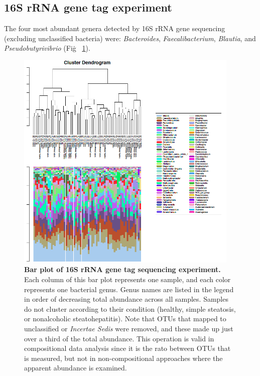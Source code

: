 \subsection{16S rRNA gene tag experiment}

The four most abundant genera detected by 16S rRNA gene sequencing (excluding unclassified bacteria) were: \textit{Bacteroides}, \textit{Faecalibacterium}, \textit{Blautia}, and \textit{Pseudobutyrivibrio} (Fig\. ~\ref{nafld_16s_barplot}).

\begin{figure}[h]
\begin{center}
\includegraphics[width=0.95\textwidth]{16s_genus_barplot.png}
\caption[Bar plot of 16S rRNA gene tag sequencing experiment.]{\textbf{Bar plot of 16S rRNA gene tag sequencing experiment.} Each column of this bar plot represents one sample, and each color represents one bacterial genus. Genus names are listed in the legend in order of decreasing total abundance across all samples. Samples do not cluster according to their condition (healthy, simple steatosis, or nonalcoholic steatohepatitis). Note that OTUs that mapped to unclassified or \textit{Incertae Sedis} were removed, and these made up just over a third of the total abundance. This operation is valid in compositional data analysis since it is the rato between OTUs that is measured, but not in non-compositional approaches where the apparent abundance is examined.}
\label{nafld_16s_barplot}
\end{center}
\end{figure}

